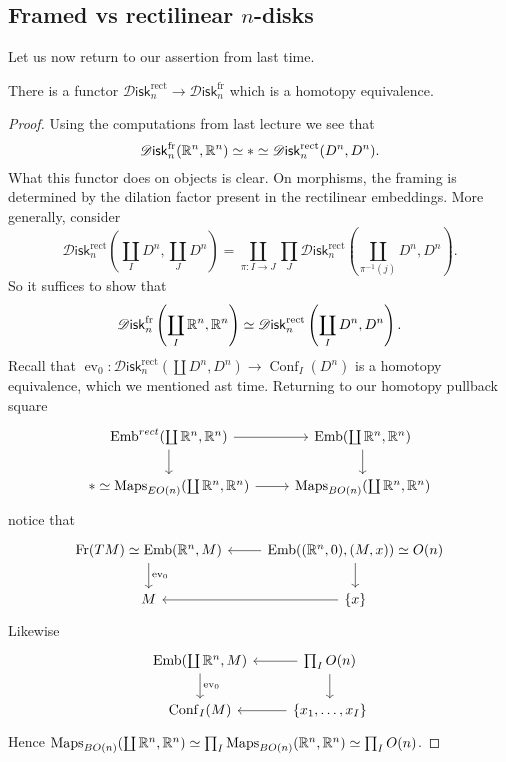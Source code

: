 \documentclass{amsart}
\DeclareMathOperator{\Emb}{Emb}
\DeclareMathOperator{\Conf}{Conf}
\DeclareMathOperator{\ev}{ev}
\newcommand{\Diskf}{\mathscr{D}\mathsf{isk}_n^\text{fr}}
\newcommand{\Diskr}{\mathscr{D}\mathsf{isk}_n^\text{rect}}
\begin{document}
\subsection{Framed vs rectilinear $n$-disks}

Let us now return to our assertion from last time. 
\begin{proposition}
    There is a functor $\Diskr \to \Diskf$ which is a homotopy equivalence.
\end{proposition}
\begin{proof}
    Using the computations from last lecture we see that 
    \begin{equation*}
        \Diskf(\R^n, \R^n) \simeq * \simeq \Diskr(D^n, D^n).
    \end{equation*}
    What this functor does on objects is clear. On morphisms, the framing is determined
    by the dilation factor present in the rectilinear embeddings.
    More generally, consider
    \begin{equation*}
        \Diskr\left(\coprod_I D^n, \coprod_J D^n\right)=\coprod_{\pi:I\to J}\prod_J\Diskr\left(\coprod_{\pi^{-1}(j)}D^n,D^n\right).
    \end{equation*}
    So it suffices to show that
    \begin{equation*}
        \Diskf\left( \coprod_I\R^n,\R^n \right) \simeq \Diskr\left( \coprod_I D^n,D^n \right).
    \end{equation*}
    Recall that $\ev_0:\Diskr(\coprod D^n,D^n)\to \Conf_I(D^n)$ is a homotopy
    equivalence, which we mentioned ast time. Returning to our homotopy pullback square
    \begin{equation*}
        \begin{tikzcd}
            \Emb^{rect}(\coprod \R^n, \R^n) \rar\dar & \Emb(\coprod\R^n,\R^n)\dar \\
            *\simeq \Maps_{EO(n)}(\coprod \R^n,\R^n) \rar & \Maps_{BO(n)}(\coprod \R^n,\R^n)
        \end{tikzcd}
    \end{equation*}
    notice that
    \begin{equation*}
        \begin{tikzcd}
            \text{Fr}(TM)\simeq \Emb(\R^n, M)\dar{\ev_0} & \Emb( (\R^n,0), (M,x))\lar\dar \simeq O(n) \\
            M & \{x\}\lar
        \end{tikzcd}
    \end{equation*}
    Likewise
    \begin{equation*}
        \begin{tikzcd}
            \Emb(\coprod \R^n, M)\dar{\ev_0} & \prod_I O(n)\lar \dar\\
            \Conf_I(M) & \{x_1,\ldots,x_I\}\lar
        \end{tikzcd}
    \end{equation*}
    Hence $\operatorname{Maps}_{BO(n)}(\coprod\mathbb{R}^n,\mathbb{R}^n)\simeq \prod_I\operatorname{Maps}_{BO(n)}(\mathbb{R}^n,\mathbb{R}^n)\simeq\prod_IO(n)$.


\end{proof}
\end{document}
